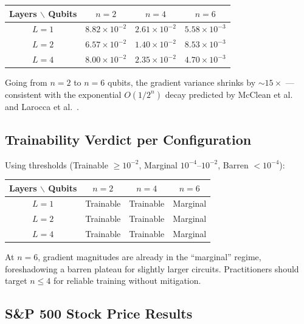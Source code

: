 \documentclass[10pt,twocolumn]{article}
\begin{document}
\begin{center}
\begin{tabular}{@{}cccc@{}}
\toprule
\textbf{Layers} $\backslash$ \textbf{Qubits} & $n{=}2$ & $n{=}4$ & $n{=}6$ \\
\midrule
$L{=}1$ & $8.82\!\times\!10^{-2}$ & $2.61\!\times\!10^{-2}$ & $5.58\!\times\!10^{-3}$ \\
$L{=}2$ & $6.57\!\times\!10^{-2}$ & $1.40\!\times\!10^{-2}$ & $8.53\!\times\!10^{-3}$ \\
$L{=}4$ & $8.00\!\times\!10^{-2}$ & $2.35\!\times\!10^{-2}$ & $4.70\!\times\!10^{-3}$ \\
\bottomrule
\end{tabular}
\end{center}

Going from $n{=}2$ to $n{=}6$ qubits, the gradient variance shrinks by ${\sim}15\times$ — consistent with the exponential $O(1/2^n)$ decay predicted by McClean et al.~\cite{mcclean2018barren} and Larocca et al.~\cite{larocca2024review}.

\subsection*{Trainability Verdict per Configuration}

Using thresholds (Trainable $\ge 10^{-2}$, Marginal $10^{-4}$--$10^{-2}$, Barren $< 10^{-4}$):

\begin{center}
\begin{tabular}{@{}cccc@{}}
\toprule
\textbf{Layers} $\backslash$ \textbf{Qubits} & $n{=}2$ & $n{=}4$ & $n{=}6$ \\
\midrule
$L{=}1$ & Trainable & Trainable & Marginal \\
$L{=}2$ & Trainable & Trainable & Marginal \\
$L{=}4$ & Trainable & Trainable & Marginal \\
\bottomrule
\end{tabular}
\end{center}

At $n{=}6$, gradient magnitudes are already in the ``marginal'' regime, foreshadowing a barren plateau for slightly larger circuits. Practitioners should target $n \le 4$ for reliable training without mitigation.

\subsection*{S\&P 500 Stock Price Results}
\end{document}
